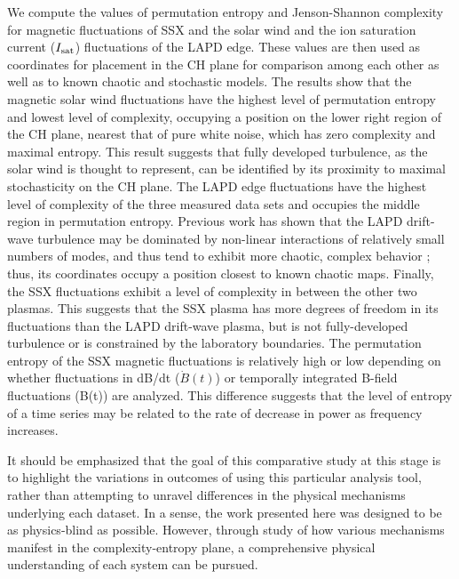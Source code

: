 \documentclass[aps,prx,twocolumn,secnumarabic,nobalancelastpage,amsmath,amssymb,
nofootinbib]{revtex4-1}
\begin{document}
We compute the values of permutation entropy and Jenson-Shannon complexity for magnetic fluctuations of SSX and the solar wind and the ion saturation current ($I_{\rm sat}$) fluctuations of the LAPD edge. These values are then used as coordinates for placement in the CH plane for comparison among each other as well as to known chaotic and stochastic models. The results show that the magnetic solar wind fluctuations have the highest level of permutation entropy and lowest level of complexity, occupying a position on the lower right region of the CH plane, nearest that of pure white noise, which has zero complexity and maximal entropy. This result suggests that fully developed turbulence, as the solar wind is thought to represent, can be identified by its proximity to maximal stochasticity on the CH plane. The LAPD edge fluctuations have the highest level of complexity of the three measured data sets and occupies the middle region in permutation entropy. Previous work has shown that the LAPD drift-wave turbulence may be dominated by non-linear interactions of relatively small numbers of modes, and thus tend to exhibit more chaotic, complex behavior \cite{pace2008}; thus, its coordinates occupy a position closest to known chaotic maps. Finally, the SSX fluctuations exhibit a level of complexity in between the other two plasmas. This suggests that the SSX plasma has more degrees of freedom in its fluctuations than the LAPD drift-wave plasma, but is not fully-developed turbulence or is constrained by the laboratory boundaries. The permutation entropy of the SSX magnetic fluctuations is relatively high or low depending on whether fluctuations in dB/dt ($\dot{B}(t)$) or temporally integrated B-field fluctuations (B(t)) are analyzed. This difference suggests that the level of entropy of a time series may be related to the rate of decrease in power as frequency increases.

It should be emphasized that the goal of this comparative study at this stage is to highlight the variations in outcomes of using this particular analysis tool, rather than attempting to unravel differences in the physical mechanisms underlying each dataset. In a sense, the work presented here was designed to be as physics-blind as possible. However, through study of how various mechanisms manifest in the complexity-entropy plane, a comprehensive physical understanding of each system can be pursued.
\end{document}
